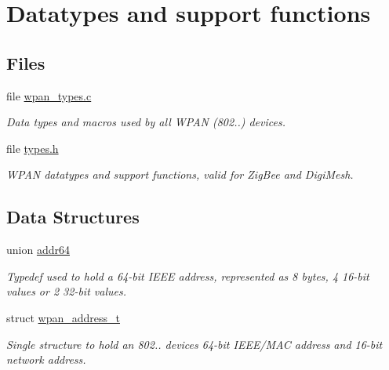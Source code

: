 \hypertarget{group__wpan__types}{}\section{Datatypes and support functions}
\label{group__wpan__types}
\subsection*{Files}
\begin{DoxyCompactItemize}
\item 
file \hyperlink{wpan__types_8c}{wpan\+\_\+types.\+c}
\begin{DoxyCompactList}\small\item\em Data types and macros used by all W\+P\+AN (802..) devices. \end{DoxyCompactList}\item 
file \hyperlink{types_8h}{types.\+h}
\begin{DoxyCompactList}\small\item\em W\+P\+AN datatypes and support functions, valid for Zig\+Bee and Digi\+Mesh. \end{DoxyCompactList}\end{DoxyCompactItemize}
\subsection*{Data Structures}
\begin{DoxyCompactItemize}
\item 
union \hyperlink{unionaddr64}{addr64}
\begin{DoxyCompactList}\small\item\em Typedef used to hold a 64-\/bit I\+E\+EE address, represented as 8 bytes, 4 16-\/bit values or 2 32-\/bit values. \end{DoxyCompactList}\item 
struct \hyperlink{structwpan__address__t}{wpan\+\_\+address\+\_\+t}
\begin{DoxyCompactList}\small\item\em Single structure to hold an 802.. device\textquotesingle{}s 64-\/bit I\+E\+E\+E/\+M\+AC address and 16-\/bit network address. \end{DoxyCompactList}\end{DoxyCompactItemize}
